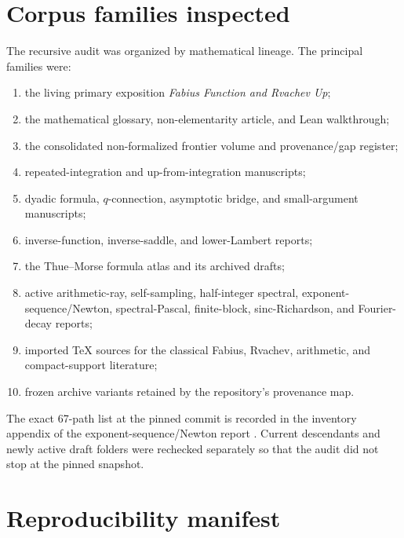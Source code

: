 \documentclass[11pt,oneside]{article}
\numberwithin{equation}{section}
\theoremstyle{definition}
\theoremstyle{remark}
\begin{document}
\section{Corpus families inspected}
\label{app:corpus}

The recursive audit was organized by mathematical lineage.  The principal
families were:
\begin{enumerate}
\item the living primary exposition \emph{Fabius Function and Rvachev Up};
\item the mathematical glossary, non-elementarity article, and Lean walkthrough;
\item the consolidated non-formalized frontier volume and provenance/gap register;
\item repeated-integration and up-from-integration manuscripts;
\item dyadic formula, \(q\)-connection, asymptotic bridge, and small-argument
      manuscripts;
\item inverse-function, inverse-saddle, and lower-Lambert reports;
\item the Thue--Morse formula atlas and its archived drafts;
\item active arithmetic-ray, self-sampling, half-integer spectral, exponent-
      sequence/Newton, spectral-Pascal, finite-block, sinc-Richardson, and
      Fourier-decay reports;
\item imported TeX sources for the classical Fabius, Rvachev, arithmetic, and
      compact-support literature;
\item frozen archive variants retained by the repository's provenance map.
\end{enumerate}
The exact 67-path list at the pinned commit is recorded in the inventory appendix
of the exponent-sequence/Newton report \cite{proveitNewton}.  Current descendants
and newly active draft folders were rechecked separately so that the audit did
not stop at the pinned snapshot.

\section{Reproducibility manifest}
\label{app:manifest}
\end{document}
